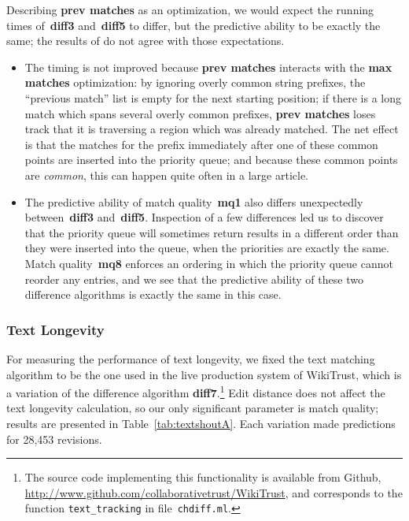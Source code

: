 
Describing \textbf{prev matches} as an optimization, we would expect
the running times of~\textbf{diff3} and~\textbf{diff5} to differ, but
the predictive ability to be exactly the same; the results of
 do not agree with those expectations.
\begin{itemize}
\item The timing is not improved because \textbf{prev matches} interacts
  with the \textbf{max matches} optimization: by ignoring overly common
  string prefixes, the ``previous match'' list is empty for the next
  starting position; if there is a long match which spans several
  overly common prefixes, \textbf{prev matches} loses track that it
  is traversing a region which was already matched.
  The net effect is that the matches for the prefix immediately after
  one of these common points are inserted into the priority queue;
  and because these common points are \textit{common}, this can happen
  quite often in a large article.
\item The predictive ability of match quality~\textbf{mq1} also differs
  unexpectedly between~\textbf{diff3} and~\textbf{diff5}.
  Inspection of a few differences led us to discover that the priority
  queue will sometimes return results in a different order than they
  were inserted into the queue, when the priorities are exactly the same.
  Match quality~\textbf{mq8} enforces an ordering in which the priority
  queue cannot reorder any entries, and we see that the predictive
  ability of these two difference algorithms is exactly the same in
  this case.
\end{itemize}


\subsubsection{Text Longevity}

For measuring the performance of text longevity,
we fixed the text matching algorithm to be the one
used in the live production system of WikiTrust,
which is a variation of the difference algorithm
\textbf{diff7}.\footnote{The source code implementing
this functionality is available from Github,
\url{http://www.github.com/collaborativetrust/WikiTrust},
and corresponds to the function \texttt{text\_tracking}
in file~\texttt{chdiff.ml}.}
Edit distance does not affect the text longevity calculation,
so our only significant parameter is match quality;
results are presented in Table~\ref{tab:textshoutA}.
Each variation made predictions for 28,453 revisions.

